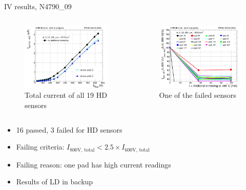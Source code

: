 \documentclass{beamer}
\begin{document}
\begin{frame}{IV results, N4790\_09}
  \begin{columns}
       \begin{figure}
           \includegraphics[width=1.0\textwidth]{plots/annealing_IV_ch101_N4790_09.png}
           \caption{Total current of all 19 HD sensors}
       \end{figure}

       \begin{figure}
           \includegraphics[width=1.0\textwidth]{plots/annealing_current_N4790_09.png}
           \caption{One of the failed sensors}
       \end{figure}

   \end{columns}

   \begin{itemize}
       \item \alert{16 passed}, \alert{3 failed} for HD sensors
       \item Failing criteria:  $I_\text{800V, total} < 2.5 \times I_\text{600V, total}$
       \item Failing reason: one pad has high current readings
       \item Results of LD in backup
   \end{itemize}
\end{frame}
\end{document}
